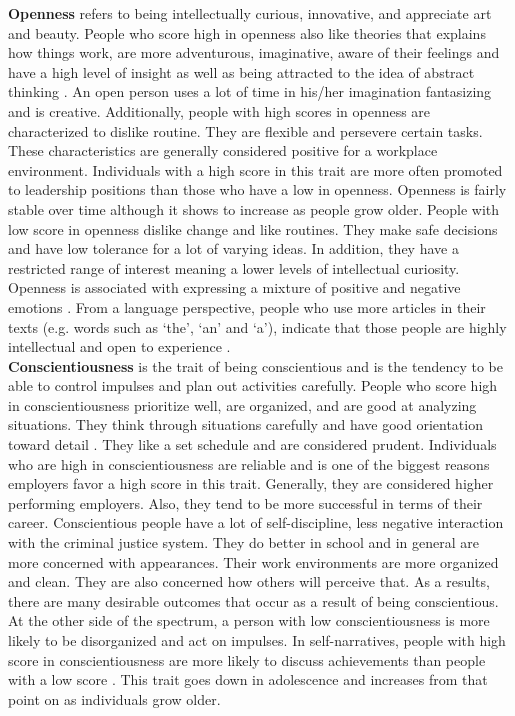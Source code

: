 \textbf{Openness} refers to being intellectually curious, innovative, and appreciate art and beauty. People who score high in openness also like theories that explains how things work, are more adventurous, imaginative, aware of their feelings and have a high level of insight as well as being attracted to the idea of abstract thinking \cite{big-five-john1999big}. An open person uses a lot of time in his/her imagination fantasizing and is creative. Additionally, people with high scores in openness are characterized to dislike routine. They are flexible and persevere certain tasks. These characteristics are generally considered positive for a workplace environment. Individuals with a high score in this trait are more often promoted to leadership positions than those who have a low in openness. Openness is fairly stable over time although it shows to increase as people grow older. People with low score in openness dislike change and like routines. They make safe decisions and have low tolerance for a lot of varying ideas. In addition, they have a restricted range of interest meaning a lower levels of intellectual curiosity. Openness is associated with expressing a mixture of positive and negative emotions \cite{openness1-BARFORD2016118}. From a language perspective, people who use more articles in their texts (e.g. words such as ‘the’, ‘an’ and ‘a’), indicate that those people are highly intellectual and open to experience \cite{openness2-fast2008personality}. \\

\textbf{Conscientiousness} is the trait of being conscientious and is the tendency to be able to control impulses and plan out activities carefully. People who score high in conscientiousness prioritize well, are organized, and are good at analyzing situations. They think through situations carefully and have good orientation toward detail \cite{big-five-john1999big}. They like a set schedule and are considered prudent. Individuals who are high in conscientiousness are reliable and is one of the biggest reasons employers favor a high score in this trait. Generally, they are considered higher performing employers. Also, they tend to be more successful in terms of their career. Conscientious people have a lot of self-discipline, less negative interaction with the criminal justice system. They do better in school and in general are more concerned with appearances. Their work environments are more organized and clean. They are also concerned how others will perceive that. As a results, there are many desirable outcomes that occur as a result of being conscientious. At the other side of the spectrum, a person with low conscientiousness is more likely to be disorganized and act on impulses. In self-narratives, people with high score in conscientiousness are more likely to discuss achievements than people with a low score \cite{conscientiousness1-HIRSH2009524}. This trait goes down in adolescence and increases from that point on as individuals grow older. \\

